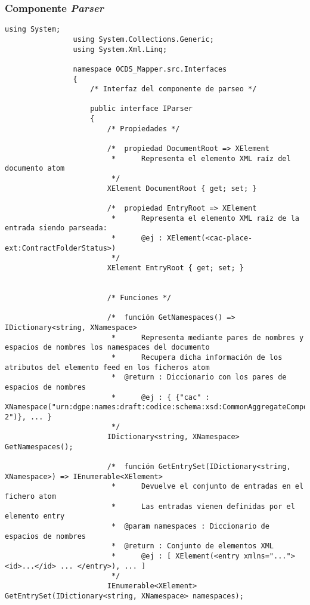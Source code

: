         \subsubsection{Componente \textit{Parser}}
            \begin{lstlisting}[language=lCSharp]
                using System;
                using System.Collections.Generic;
                using System.Xml.Linq;
                
                namespace OCDS_Mapper.src.Interfaces
                {
                    /* Interfaz del componente de parseo */
                    
                    public interface IParser
                    {
                        /* Propiedades */
                
                        /*  propiedad DocumentRoot => XElement
                         *      Representa el elemento XML raíz del documento atom
                         */
                        XElement DocumentRoot { get; set; }
                
                        /*  propiedad EntryRoot => XElement
                         *      Representa el elemento XML raíz de la entrada siendo parseada:
                         *      @ej : XElement(<cac-place-ext:ContractFolderStatus>)
                         */
                        XElement EntryRoot { get; set; }
                
                
                        /* Funciones */
                
                        /*  función GetNamespaces() => IDictionary<string, XNamespace>
                         *      Representa mediante pares de nombres y espacios de nombres los namespaces del documento
                         *      Recupera dicha información de los atributos del elemento feed en los ficheros atom
                         *  @return : Diccionario con los pares de espacios de nombres
                         *      @ej : { {"cac" : XNamespace("urn:dgpe:names:draft:codice:schema:xsd:CommonAggregateComponents-2")}, ... }
                         */
                        IDictionary<string, XNamespace> GetNamespaces();
                
                        /*  función GetEntrySet(IDictionary<string, XNamespace>) => IEnumerable<XElement>
                         *      Devuelve el conjunto de entradas en el fichero atom
                         *      Las entradas vienen definidas por el elemento entry
                         *  @param namespaces : Diccionario de espacios de nombres
                         *  @return : Conjunto de elementos XML
                         *      @ej : [ XElement(<entry xmlns="..."> <id>...</id> ... </entry>), ... ]
                         */
                        IEnumerable<XElement> GetEntrySet(IDictionary<string, XNamespace> namespaces);
                

\end{lstlisting}
